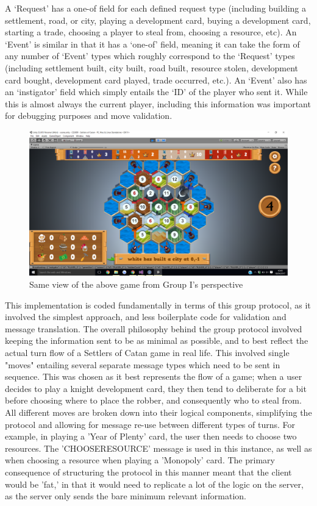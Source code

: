\documentclass[a4paper,doc,draftfirst]{apa6}
\begin{document}
A ‘Request’ has a one-of field for each defined request type (including building a settlement, road, or city, playing a development card, buying a development card, starting a trade, choosing a player to steal from, choosing a resource, etc). An ‘Event’ is similar in that it has a ‘one-of’ field, meaning it can take the form of any number of ‘Event’ types which roughly correspond to the ‘Request’ types (including settlement built, city built, road built, resource stolen, development card bought, development card played, trade occurred, etc.). An ‘Event’ also has an ‘instigator’ field which simply entails the ‘ID’ of the player who sent it. While this is almost always the current player, including this information was important for debugging purposes and move validation.


\begin{figure}[hbtp]
      \includegraphics[width=\textwidth]{GroupI}
      \caption{Same view of the above game from Group I's perspective}
\end{figure}

This implementation is coded fundamentally in terms of this group protocol, as it involved the simplest approach, and less boilerplate code for validation and message translation. The overall philosophy behind the group protocol involved keeping the information sent to be as minimal as possible, and to best reflect the actual turn flow of a Settlers of Catan game in real life. This involved single "moves" entailing several separate message types which need to be sent in sequence. This was chosen as it best represents the flow of a game; when a user decides to play a knight development card, they then tend to deliberate for a bit before choosing where to place the robber, and consequently who to steal from. All different moves are broken down into their logical components, simplifying the protocol and allowing for message re-use between different types of turns. For example, in playing a 'Year of Plenty' card, the user then needs to choose two resources. The 'CHOOSERESOURCE' message is used in this instance, as well as when choosing a resource when playing a 'Monopoly' card. The primary consequence of structuring the protocol in this manner meant that the client would be 'fat,' in that it would need to replicate a lot of the logic on the server, as the server only sends the bare minimum relevant information.
\end{document}
